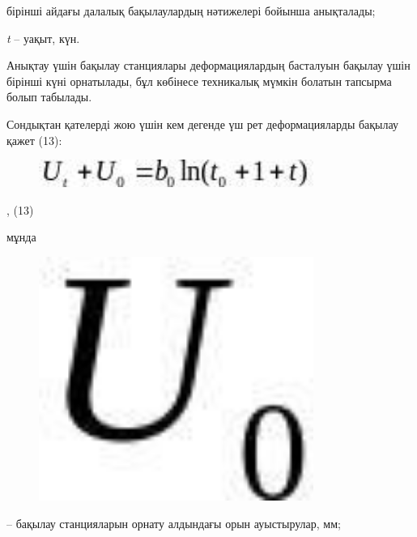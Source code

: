 бірінші айдағы далалық бақылаулардың нәтижелері бойынша анықталады;

\emph{t} -- уақыт, күн.

Анықтау үшін бақылау станциялары деформациялардың басталуын бақылау үшін
бірінші күні орнатылады, бұл көбінесе техникалық мүмкін болатын тапсырма
болып табылады.

Сондықтан қателерді жою үшін кем дегенде үш рет деформацияларды бақылау
қажет (13):

\begin{figure}[H]
	\centering
	\includegraphics[width=0.8\textwidth]{assets/1305}
	\caption*{}
\end{figure}, (13)

мұнда \begin{figure}[H]
	\centering
	\includegraphics[width=0.8\textwidth]{assets/1306}
	\caption*{}
\end{figure} -- бақылау станцияларын
орнату алдындағы орын ауыстырулар, мм;

